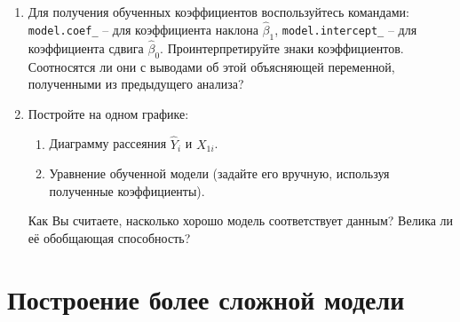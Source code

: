 \documentclass[11pt, a4paper]{extarticle}
\begin{document}
\begin{enumerate}
	  {\tt np.array(data['Humidity']).reshape(-1, 1)}
	  
	   Тогда полный код обучения модели будет выглядеть следующим образом: 
	   
	    {\tt model.fit(np.array(data['Humidity']).reshape(-1, 1), data['Temperature (C)'])}
	    
	     где {\tt Temperature (C)} – зависимая переменная.
	
	Повторите эту процедуру для Вашей модели. 
	
	\item Для получения обученных коэффициентов воспользуйтесь командами: 
	{\tt model.coef\_} – для коэффициента наклона $\hat{\beta}_1$, {\tt model.intercept\_} – для коэффициента сдвига $\hat{\beta}_0$. Проинтерпретируйте знаки коэффициентов. Соотносятся ли они с выводами об этой объясняющей переменной, полученными из предыдущего анализа? 
	\item Постройте на одном графике:
	\begin{enumerate}[label=\alph*)]
		\item Диаграмму рассеяния $\hat{Y}_i$ и $X_{1i}$. 
		\item Уравнение обученной модели (задайте его вручную, используя полученные коэффициенты).
	\end{enumerate}
	Как Вы считаете, насколько хорошо модель соответствует данным? Велика ли её обобщающая способность? 
	
\end{enumerate}

\section{Построение более сложной модели}
\end{document}
